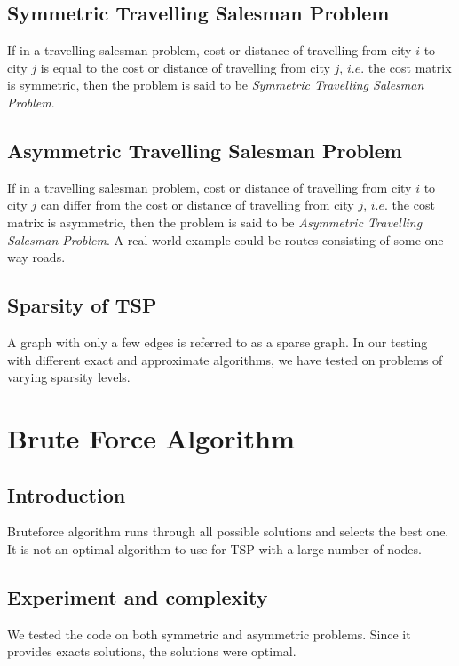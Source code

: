 \documentclass[11pt, english]{article}
\begin{document}
\subsection{Symmetric Travelling Salesman Problem}

If in a travelling salesman problem, cost or distance of travelling from city $i$ to city $j$ is equal to the cost or distance of travelling from city $j$, $i.e.$ the cost matrix is symmetric, then the problem is said to be \emph{Symmetric Travelling Salesman Problem}.

\subsection{Asymmetric Travelling Salesman Problem}

If in a travelling salesman problem, cost or distance of travelling from city $i$ to city $j$ can differ from the cost or distance of travelling from city $j$, $i.e.$ the cost matrix is asymmetric, then the problem is said to be \emph{Asymmetric Travelling Salesman Problem}. A real world example could be routes consisting of some one-way roads.


\subsection{Sparsity of TSP}


A graph with only a few edges is referred to as a sparse graph. In our testing with different exact and approximate algorithms, we have tested on problems of varying sparsity levels.

\newpage
\section{Brute Force Algorithm}
\subsection{Introduction}
Bruteforce algorithm runs through all possible solutions and selects the best one. It is not an optimal algorithm to use for TSP with a large number of nodes.

\subsection{Experiment and complexity}

We tested the code on both symmetric and asymmetric problems. Since it provides exacts solutions, the solutions were optimal.\\
\end{document}
